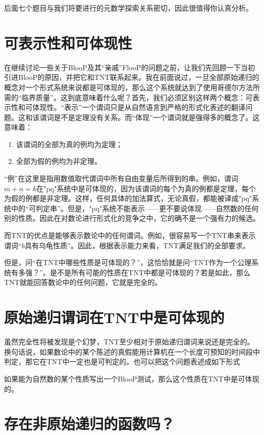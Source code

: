 后面七个题目与我们将要进行的元数学探索关系密切，因此很值得你认真分析。

\section{可表示性和可体现性}

在继续讨论一些关于BlooP及其“亲戚”FlooP的问题之前，让我们先回顾一下当初引进BlooP的原因，并把它和TNT联系起来。我在前面说过，一旦全部原始递归的概念对一个形式系统来说都是可体现的，那么这个系统就达到了使用哥德尔方法所需的“临界质量”。这到底意味着什么呢？首先，我们必须区别这样两个概念：可表示性和可体现性。“表示”一个谓词只是从自然语言到严格的形式化表述的翻译问题。这和该谓词是不是定理没有关系。而“体现”一个谓词就是强得多的概念了。这意味着：
\begin{enumerate}
\item 该谓词的全部为真的例均为定理；
\item 全部为假的例均为非定理。
\end{enumerate}

“例”在这里是指用数值取代谓词中所有自由变量后所得到的串。例如，谓词$m+n=k$在"pq"系统中是可体现的，因为该谓词的每个为真的例都是定理，每个为假的例都是非定理。这样，任何具体的加法算式，无论真假，都能被译成"pq"系统中的“可判定串”。但是，"pq"系统不能表示——更不要说体现——自然数的任何别的性质。因此在对数论进行形式化的竞争之中，它的确不是一个强有力的候选。

而TNT的优点是能够表示数论中的任何谓词。例如，很容易写一个TNT串来表示谓词“$b$具有乌龟性质”。因此，根据表示能力来看，TNT满足我们的全部要求。

但是，问“在TNT中哪些性质是可体现的？”，这恰恰就是问“TNT作为一个公理系统有多强？”。是不是所有可能的性质在TNT中都是可体现的？若是如此，那么TNT就能回答数论中的任何问题，它就是完全的。

\section{原始递归谓词在TNT中是可体现的}

虽然完全性将被发现是个幻梦，TNT至少相对于原始递归谓词来说还是完全的。换句话说，如果数论中的某个陈述的真假能用计算机在一个长度可预知的时间段中判定，那它在TNT中一定也是可判定的。也可以把这个问题表述成如下形式

\begin{block}
如果能为自然数的某个性质写出一个BlooP测试，那么这个性质在TNT中是可体现的。
\end{block}

\section{存在非原始递归的函数吗？}

